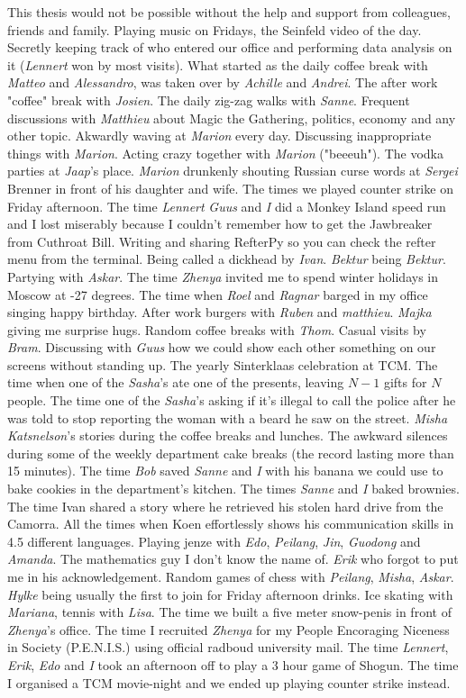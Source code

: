This thesis would not be possible without the help and support from colleagues, friends and family. Playing music on Fridays, the Seinfeld video of the day. Secretly keeping track of who entered our office and performing data analysis on it (\emph{Lennert} won by most visits). What started as the daily coffee break with \emph{Matteo} and \emph{Alessandro}, was taken over by \emph{Achille} and \emph{Andrei}. The after work "coffee" break with \emph{Josien}. The daily zig-zag walks with \emph{Sanne}. Frequent discussions with \emph{Matthieu} about Magic the Gathering, politics, economy and any other topic. Akwardly waving at \emph{Marion} every day. Discussing inappropriate things with \emph{Marion}. Acting crazy together with \emph{Marion} ("beeeuh"). The vodka parties at \emph{Jaap}'s place. \emph{Marion} drunkenly shouting Russian curse words at \emph{Sergei} Brenner in front of his daughter and wife. The times we played counter strike on Friday afternoon. The time \emph{Lennert} \emph{Guus} and \emph{I} did a Monkey Island speed run and I lost miserably because I couldn't remember how to get the Jawbreaker from Cuthroat Bill. Writing and sharing RefterPy so you can check the refter menu from the terminal. Being called a dickhead by \emph{Ivan}. \emph{Bektur} being \emph{Bektur}. Partying with \emph{Askar}. The time \emph{Zhenya} invited me to spend winter holidays in Moscow at -27 degrees. The time when \emph{Roel} and \emph{Ragnar} barged in my office singing happy birthday. After work burgers with \emph{Ruben} and \emph{matthieu}. \emph{Majka} giving me surprise hugs. Random coffee breaks with \emph{Thom}. Casual visits by \emph{Bram}. Discussing with \emph{Guus} how we could show each other something on our screens without standing up. The yearly Sinterklaas celebration at TCM. The time when one of the \emph{Sasha}'s ate one of the presents, leaving $N-1$ gifts for $N$ people. The time one of the \emph{Sasha}'s asking if it's illegal to call the police after he was told to stop reporting the woman with a beard he saw on the street. \emph{Misha Katsnelson}'s stories during the coffee breaks and lunches. The awkward silences during some of the weekly department cake breaks (the record lasting more than 15 minutes). The time \emph{Bob} saved \emph{Sanne} and \emph{I} with his banana we could use to bake cookies in the department's kitchen. The times \emph{Sanne} and \emph{I} baked brownies. The time Ivan shared a story where he retrieved his stolen hard drive from the Camorra. All the times when Koen effortlessly shows his communication skills in 4.5 different languages. Playing jenze with \emph{Edo}, \emph{Peilang}, \emph{Jin}, \emph{Guodong} and \emph{Amanda}. The mathematics guy I don't know the name of. \emph{Erik} who forgot to put me in his acknowledgement. Random games of chess with \emph{Peilang}, \emph{Misha}, \emph{Askar}. \emph{Hylke} being usually the first to join for Friday afternoon drinks. Ice skating with \emph{Mariana}, tennis with \emph{Lisa}. The time we built a five meter snow-penis in front of \emph{Zhenya}'s office. The time I recruited \emph{Zhenya} for my People Encoraging Niceness in Society (P.E.N.I.S.) using official radboud university mail. The time \emph{Lennert}, \emph{Erik}, \emph{Edo} and \emph{I} took an afternoon off to play a 3 hour game of Shogun. The time I organised a TCM movie-night and we ended up playing counter strike instead. 
